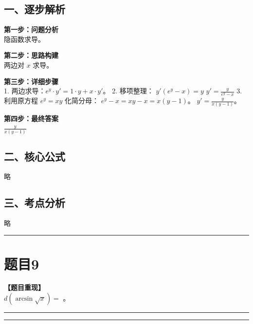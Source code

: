 \documentclass[12pt, a4paper]{ctexart}
\newcommand{\TopSeparator}{
    \par\noindent\rule{\textwidth}{1.5pt}\vspace{0.5em} %
}
\newcommand{\AnalysisSeparator}{
    \par\noindent\rule{\textwidth}{0.5pt}\vspace{0.2em}\hrule\vspace{0.5em} %
}
\newenvironment{RedAnalysis}{
    \par
    \color{red} %
}{
    \par
    \color{black} %
}
\begin{document}
\begin{RedAnalysis}

\subsection*{一、逐步解析}

\textbf{第一步：问题分析} \\
隐函数求导。

\textbf{第二步：思路构建} \\
两边对 $x$ 求导。

\textbf{第三步：详细步骤} \\
1. 两边求导：$e^y \cdot y' = 1 \cdot y + x \cdot y'$。
2. 移项整理：
   $y'(e^y - x) = y$
   $y' = \frac{y}{e^y - x}$
3. 利用原方程 $e^y = xy$ 化简分母：
   $e^y - x = xy - x = x(y-1)$。
   $y' = \frac{y}{x(y-1)}$。

\textbf{第四步：最终答案} \\
$\frac{y}{x(y-1)}$

\subsection*{二、核心公式}
略

\subsection*{三、考点分析}
略

\end{RedAnalysis}

\vspace{2em}

\TopSeparator
\section*{题目9}

\textbf{【题目重现】} \\
$ d(\arcsin\sqrt{x}) = $ \underline{\hspace{2cm}}。

\AnalysisSeparator
\end{document}
